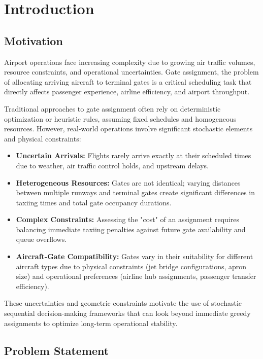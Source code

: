 \chapter{Introduction}
\label{chap:introduction}

\section{Motivation}
Airport operations face increasing complexity due to growing air traffic volumes, resource constraints, and operational uncertainties.
Gate assignment, the problem of allocating arriving aircraft to terminal gates is a critical scheduling task that directly affects passenger experience, airline efficiency, and airport throughput.

Traditional approaches to gate assignment often rely on deterministic optimization or heuristic rules, assuming fixed schedules and homogeneous resources.
However, real-world operations involve significant stochastic elements and physical constraints:
\begin{itemize}
	\item \textbf{Uncertain Arrivals:} Flights rarely arrive exactly at their scheduled times due to weather, air traffic control holds, and upstream delays.
	\item \textbf{Heterogeneous Resources:} Gates are not identical; varying distances between multiple runways and terminal gates create significant differences in taxiing times and total gate occupancy durations.
	\item \textbf{Complex Constraints:} Assessing the "cost" of an assignment requires balancing immediate taxiing penalties against future gate availability and queue overflows.
	\item \textbf{Aircraft-Gate Compatibility:} Gates vary in their suitability for 
	different aircraft types due to physical constraints (jet bridge configurations, 
	apron size) and operational preferences (airline hub assignments, passenger 
	transfer efficiency).
\end{itemize}

These uncertainties and geometric constraints motivate the use of stochastic sequential decision-making frameworks that can look beyond immediate greedy assignments to optimize long-term operational stability.

\section{Problem Statement}


